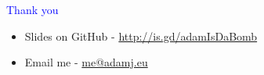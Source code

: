 \documentclass[landscape]{slides}
\begin{document}
\begin{slide}
    \textcolor{blue}{\Large{Thank you}}

    \begin{itemize}
        \item Slides on GitHub - \url{http://is.gd/adamIsDaBomb}
        \item Email me - \url{me@adamj.eu}
    \end{itemize}

\end{slide}
\end{document}
